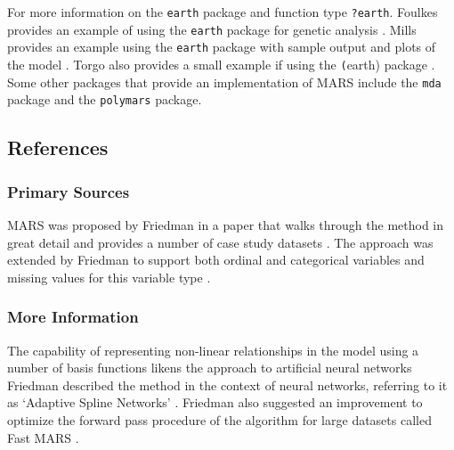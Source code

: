 

For more information on the \texttt{earth} package and function type \texttt{?earth}. Foulkes provides an example of using the \texttt{earth} package for genetic analysis \cite{Foulkes2009}. Mills provides an example using the \texttt{earth} package with sample output and plots of the model \cite{Mills2010}. Torgo also provides a small example if using the \texttt(earth) package \cite{Torgo2009}. 
Some other packages that provide an implementation of MARS include the \texttt{mda} package and the \texttt{polymars} package.


\subsection{References}

\subsubsection{Primary Sources}
MARS was proposed by Friedman in a paper that walks through the method in great detail and provides a number of case study datasets \cite{Friedman1991}.
The approach was extended by Friedman to support both ordinal and categorical variables and missing values for this variable type \cite{Friedman1991a, Friedman1993a}.

\subsubsection{More Information}
The capability of representing non-linear relationships in the model using a number of basis functions likens the approach to artificial neural networks Friedman described the method in the context of neural networks, referring to it as `Adaptive Spline Networks' \cite{Friedman1991b, Friedman1991c}.
Friedman also suggested an improvement to optimize the forward pass procedure of the algorithm for large datasets called Fast MARS \cite{Friedman1993}.

